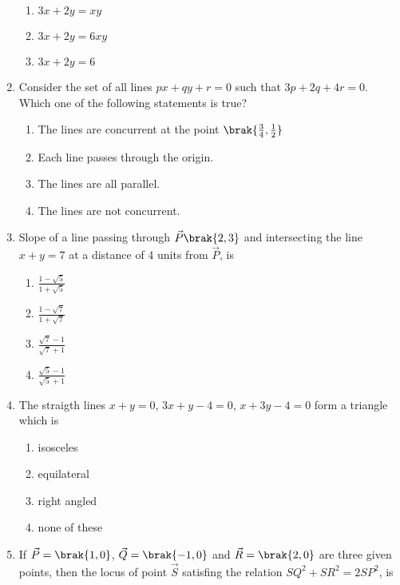 \begin{enumerate}[label=\thesubsection.\arabic*.,ref=\thesubsection.\theenumi]
\begin{multicols}{2}
\begin{enumerate}
\item $3x+2y = xy$ 
\item $3x+2y = 6xy$ 
\item $3x+2y = 6$
\end{enumerate}
\end{multicols}
%
\item Consider the set of all lines $px+qy+r=0$ such that 
$3p+2q+4r=0$. Which one of the following statements is true? 
%
\hfill {}
\begin{enumerate}
\item The lines are concurrent at the point $\brak{\frac{3}{4}, \frac{1}{2}}$
\item Each line passes through the origin. 
\item The lines are all parallel.
\item The lines are not concurrent.
\end{enumerate}
%
\item Slope of a line passing through $\vec{P}\brak{2, 3}$ and intersecting the line $x+y=7$ at a distance of 4 units from $\vec{P}$, is
%
\hfill {}
\begin{multicols}{4}
\begin{enumerate}
\item $\frac{1-\sqrt{5}}{1+\sqrt{5}}$
\item $\frac{1-\sqrt{7}}{1+\sqrt{7}}$
\item $\frac{\sqrt{7}-1}{\sqrt{7}+1}$
\item $\frac{\sqrt{5}-1}{\sqrt{5}+1}$
\end{enumerate}
\end{multicols}
\item The straigth lines $x+y=0$, $3x+y-4=0$, $x+3y-4=0$ form a triangle which is \hfill {}
\begin{multicols}{2}
\begin{enumerate}   
     \item isosceles
     \item equilateral
     \item right angled
     \item none of these
\end{enumerate}
\end{multicols}
\item If $\vec{P}=\brak{1,0}$, $\vec{Q}=\brak{-1,0}$ and $\vec{R}=\brak{2,0}$ are three given points, then the locus of point $\vec{S}$ satisfing the relation $SQ^2+SR^2=2SP^2$, is 
\hfill {}
\begin{multicols}{2}

\end{multicols}
\end{enumerate}
